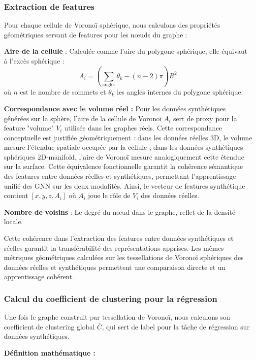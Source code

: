 \subsubsection{Extraction de features}

Pour chaque cellule de Voronoï sphérique, nous calculons des propriétés géométriques servant de features pour les nœuds du graphe :

\textbf{Aire de la cellule} : Calculée comme l'aire du polygone sphérique, elle équivaut à l'excès sphérique :
\[
A_i = \left(\sum_{\text{angles}} \theta_k - (n-2)\pi\right) R^2
\]
où $n$ est le nombre de sommets et $\theta_k$ les angles internes du polygone sphérique.

\textbf{Correspondance avec le volume réel :}
Pour les données synthétiques générées sur la sphère, l'aire de la cellule de Voronoï $A_i$ sert de proxy pour la feature "volume" $V_i$ utilisée dans les graphes réels. Cette correspondance conceptuelle est justifiée géométriquement : dans les données réelles 3D, le volume mesure l'étendue spatiale occupée par la cellule ; dans les données synthétiques sphériques 2D-manifold, l'aire de Voronoï mesure analogiquement cette étendue sur la surface. Cette équivalence fonctionnelle garantit la cohérence sémantique des features entre données réelles et synthétiques, permettant l'apprentissage unifié des GNN sur les deux modalités. Ainsi, le vecteur de features synthétique contient $[x, y, z, A_i]$ où $A_i$ joue le rôle de $V_i$ des données réelles.

\textbf{Nombre de voisins} : Le degré du nœud dans le graphe, reflet de la densité locale.

Cette cohérence dans l'extraction des features entre données synthétiques et réelles garantit la transférabilité des représentations apprises. Les mêmes métriques géométriques calculées sur les tessellations de Voronoï sphériques des données réelles et synthétiques permettent une comparaison directe et un apprentissage cohérent.

\subsubsection{Calcul du coefficient de clustering pour la régression}

Une fois le graphe construit par tessellation de Voronoï, nous calculons son coefficient de clustering global $\bar{C}$, qui sert de label pour la tâche de régression sur données synthétiques.

\textbf{Définition mathématique :}


